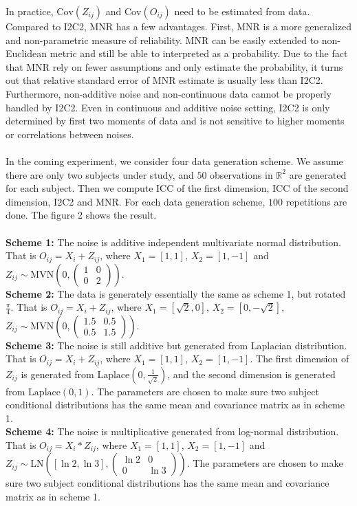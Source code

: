 \documentclass[11pt,journal,compsoc]{IEEEtran}
\begin{document}
In practice, $\text{Cov}(Z_{ij})$ and $\text{Cov}(O_{ij})$ need to be estimated from data. Compared to I2C2, MNR has a few advantages. First, MNR is a more generalized and non-parametric measure of reliability. MNR can be easily extended to non-Euclidean metric and still be able to interpreted as a probability. Due to the fact that MNR rely on fewer assumptions and only estimate the probability, it turns out that relative standard error of MNR estimate is usually less than I2C2. Furthermore, non-additive noise and non-continuous data cannot be properly handled by I2C2. Even in continuous and additive noise setting, I2C2 is only determined by first two moments of data and is not sensitive to higher moments or correlations between noises.\\
\\
In the coming experiment, we consider four data generation scheme. We assume there are only two subjects under study, and $50$ observations in $\mathbb{R}^2$ are generated for each subject. Then we compute ICC of the first dimension, ICC of the second dimension, I2C2 and MNR. For each data generation scheme, $100$ repetitions are done. The figure 2 shows the result.\\
\\
\textbf{Scheme 1:} The noise is additive independent multivariate normal distribution. That is $O_{ij}=X_i+Z_{ij}$, where $X_1=[1,1]$, $X_2=[1,-1]$ and $Z_{ij}\sim\text{MVN}(0,(\begin{matrix} 1 & 0 \\ 0 & 2\end{matrix}))$. \\
\textbf{Scheme 2:} The data is generately essentially the same as scheme 1, but rotated $\frac{\pi}{4}$. That is $O_{ij}=X_i+Z_{ij}$, where $X_1=[\sqrt{2},0]$, $X_2=[0,-\sqrt{2}]$, $Z_{ij}\sim\text{MVN}(0,(\begin{matrix} 1.5 & 0.5 \\ 0.5 & 1.5\end{matrix}))$. \\
\textbf{Scheme 3:} The noise is still additive but generated from Laplacian distribution. That is $O_{ij}=X_i+Z_{ij}$, where $X_1=[1,1]$, $X_2=[1,-1]$. The first dimension of $Z_{ij}$ is generated from $\text{Laplace}(0,\frac{1}{\sqrt{2}})$, and the second dimension is generated from $\text{Laplace}(0,1)$. The parameters are chosen to make sure two subject conditional distributions has the same mean and covariance matrix as in scheme 1. \\
\textbf{Scheme 4:} The noise is multiplicative generated from log-normal distribution. That is $O_{ij}=X_i*Z_{ij}$, where $X_1=[1,1]$, $X_2=[1,-1]$  and $Z_{ij}\sim\text{LN}([\ln{2},\ln{3}],(\begin{matrix} \ln{2} & 0 \\ 0 & \ln{3}\end{matrix}))$. The parameters are chosen to make sure two subject conditional distributions has the same mean and covariance matrix as in scheme 1. \\
\end{document}
